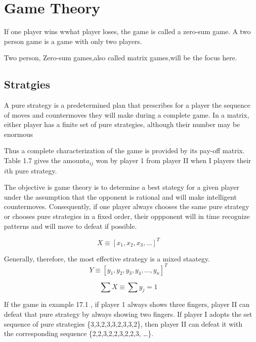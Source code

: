 \documentclass[]{report}
\begin{document}

\section{Game Theory}

If one player wins wwhat player loses, the game is called a zero-sum game. A two person game is a game with only two players.

Two person, Zero-sum games,also called matrix games,will be the focus here.
\subsection{Stratgies}

A pure strategy is a predetermined plan that prescribes for a player the sequence of moves and countermoves they will make
during a complete game.
In a matrix, either player has a finite set of pure strategies, although their number may be enormous

Thus a complete characterization of the game is provided by its pay-off matrix.
Table 1.7 gives the amount$a_{ij}$ won by player 1 from player II when I players their $i$th pure strategy.



The objective is game theory is to determine a best stategy for a given player under the assumption that the opponent is rational and will 
make intelligent countermoves. Consequently, if one player always chooses the same pure strategy or chooses pure strategies in a fixed order, their oppponent will in time 
recognize patterns and will move to defeat if possible.

\[X \equiv [x_1,x_2,x_3,\ldots]^T  \]

Generally, therefore, the most effective strategy is a mixed staategy.
\[Y \equiv [y_1,y_2,y_3,y_4,\ldots,y_n]^T  \]

\[  \sum X \equiv \sum y_j  = 1 \]

If the game in example 17.1 , if player 1 always shows three fingers, player II can defeat that pure strategy by always showing two fingers.
If player I adopts the set sequence of pure strategies \{3,3,2,3,3,2,3,3,2\}, then player II can defeat it with the corresponding sequence
\{2,2,3,2,2,3,2,2,3, \ldots\}.
\end{document}
